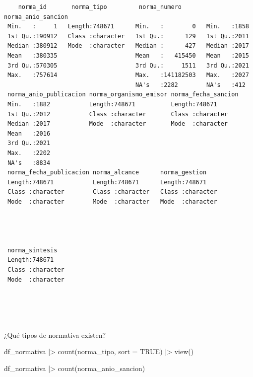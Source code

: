 \documentclass[
  letterpaper,
  DIV=11,
  numbers=noendperiod]{scrreprt}
\newenvironment{Shaded}{\begin{snugshade}}{\end{snugshade}}
\newcommand{\AttributeTok}[1]{\textcolor[rgb]{0.40,0.45,0.13}{#1}}
\newcommand{\ConstantTok}[1]{\textcolor[rgb]{0.56,0.35,0.01}{#1}}
\newcommand{\FunctionTok}[1]{\textcolor[rgb]{0.28,0.35,0.67}{#1}}
\newcommand{\NormalTok}[1]{\textcolor[rgb]{0.00,0.23,0.31}{#1}}
\newcommand{\SpecialCharTok}[1]{\textcolor[rgb]{0.37,0.37,0.37}{#1}}
\begin{document}
\begin{verbatim}
    norma_id       norma_tipo         norma_numero       norma_anio_sancion
 Min.   :     1   Length:748671      Min.   :        0   Min.   :1858      
 1st Qu.:190912   Class :character   1st Qu.:      129   1st Qu.:2011      
 Median :380912   Mode  :character   Median :      427   Median :2017      
 Mean   :380335                      Mean   :   415450   Mean   :2015      
 3rd Qu.:570305                      3rd Qu.:     1511   3rd Qu.:2021      
 Max.   :757614                      Max.   :141182503   Max.   :2027      
                                     NA's   :2282        NA's   :412       
 norma_anio_publicacion norma_organismo_emisor norma_fecha_sancion
 Min.   :1882           Length:748671          Length:748671      
 1st Qu.:2012           Class :character       Class :character   
 Median :2017           Mode  :character       Mode  :character   
 Mean   :2016                                                     
 3rd Qu.:2021                                                     
 Max.   :2202                                                     
 NA's   :8834                                                     
 norma_fecha_publicacion norma_alcance      norma_gestion     
 Length:748671           Length:748671      Length:748671     
 Class :character        Class :character   Class :character  
 Mode  :character        Mode  :character   Mode  :character  
                                                              
                                                              
                                                              
                                                              
 norma_sintesis    
 Length:748671     
 Class :character  
 Mode  :character  
                   
                   
                   
                   
\end{verbatim}

¿Qué tipos de normativa existen?

\begin{Shaded}
\begin{Highlighting}[]
\NormalTok{df\_normativa }\SpecialCharTok{|\textgreater{}} 
  \FunctionTok{count}\NormalTok{(norma\_tipo, }\AttributeTok{sort =} \ConstantTok{TRUE}\NormalTok{) }\SpecialCharTok{|\textgreater{}} 
  \FunctionTok{view}\NormalTok{()}

\NormalTok{df\_normativa }\SpecialCharTok{|\textgreater{}} 
  \FunctionTok{count}\NormalTok{(norma\_anio\_sancion)}
\end{Highlighting}
\end{Shaded}
\end{document}
